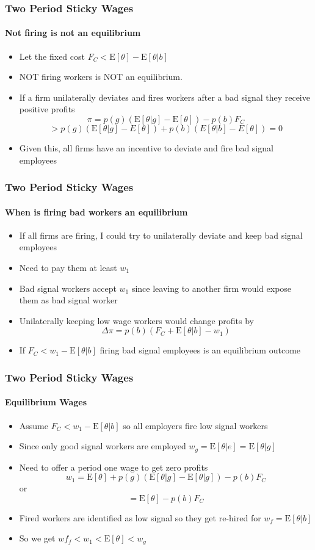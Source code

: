 \documentclass{beamer}
\newcommand{\E}{\mathrm{E}}
\begin{document}
\begin{frame}
\frametitle{Two Period Sticky Wages}
\framesubtitle{Not firing is not an equilibrium}
\begin{itemize}
	\setlength{\itemsep}{3mm}
	\item Let the fixed cost $F_C < \E[\theta] - \E[\theta |b]$
	\item NOT firing workers is NOT an equilibrium. 
	\item If a firm unilaterally deviates and fires workers after a bad signal they receive positive profits 
	$$ \pi = p(g) (\E[\theta|g] - \E[\theta]) - p(b)F_C $$
	$$ > p(g)( \E[\theta|g] - E[\theta]) + p(b)(E[\theta|b] - E[\theta]) = 0 $$
	\item Given this, all firms have an incentive to deviate and fire bad signal employees 
\end{itemize}

\end{frame}


\begin{frame}
\frametitle{Two Period Sticky Wages}
\framesubtitle{When is firing bad workers an equilibrium }
\begin{itemize}
	\setlength{\itemsep}{3mm}
	\item If all firms are firing, I could try to unilaterally deviate and keep bad signal employees
	\item Need to pay them at least $w_1$ 
	\item Bad signal workers accept $w_1$ since leaving to another firm would expose them as bad signal worker
	\item Unilaterally keeping low wage workers would change profits by 
	$$ \Delta \pi = p(b)(F_C + \E[\theta|b] - w_1)$$
	\item If $F_C < w_1 - \E[\theta|b]$ firing bad signal employees is an equilibrium outcome
	
\end{itemize}

\end{frame}

\begin{frame}
\frametitle{Two Period Sticky Wages}
\framesubtitle{Equilibrium Wages}
\begin{itemize}
	\setlength{\itemsep}{3mm}
		\item Assume $F_C < w_1 - \E[\theta|b]$ so all employers fire low signal workers
		\item Since only good signal workers are employed $w_g = \E[\theta |e] = \E[\theta|g]$
		\item  Need to offer a period one wage to get zero profits 
		$$w_1 = \E[\theta] + p(g)(\E[\theta|g] - \E[\theta|g]) - p(b) F_C   $$
		or 
		$$= \E[\theta] - p(b) F_C$$
		\item Fired workers are identified as low signal so they get re-hired for $w_f = \E[\theta |b]$
		\item So we get $wf_f < w_1 < \E[\theta] < w_g$ 
	
\end{itemize}

\end{frame}
\end{document}
